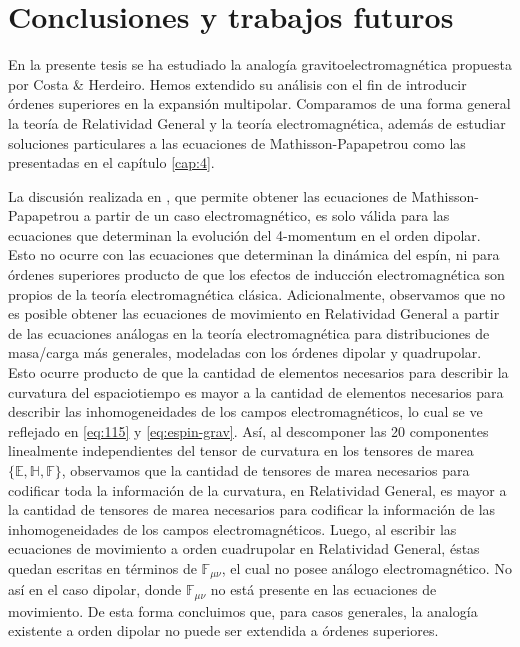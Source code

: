 \chapter{Conclusiones y trabajos futuros}

En la presente tesis se ha estudiado la analogía gravitoelectromagnética propuesta por Costa \& Herdeiro. Hemos extendido su análisis con el fin de introducir órdenes superiores en la expansión multipolar. Comparamos de una forma general la teoría de Relatividad General y la teoría electromagnética, además de estudiar soluciones particulares a las ecuaciones de Mathisson-Papapetrou como las presentadas en el capítulo \ref{cap:4}.

La discusión realizada en \cite{Costa-Herdeiro}, que permite obtener las ecuaciones de Mathisson-Papapetrou a partir de un caso electromagnético, es solo válida para las ecuaciones que determinan la evolución del 4-momentum en el orden dipolar. Esto no ocurre con las ecuaciones que determinan la dinámica del espín, ni para órdenes superiores producto de que los efectos de inducción electromagnética son propios de la teoría electromagnética clásica. Adicionalmente, observamos que no es posible obtener las ecuaciones de movimiento en Relatividad General a partir de las ecuaciones análogas en la teoría electromagnética para distribuciones de masa/carga más generales, modeladas con los órdenes dipolar y quadrupolar. Esto ocurre producto de que la cantidad de elementos necesarios para describir la curvatura del espaciotiempo es mayor a la cantidad de elementos necesarios para describir las inhomogeneidades de los campos electromagnéticos, lo cual se ve reflejado en \eqref{eq:115} y \eqref{eq:espin-grav}. Así, al descomponer las 20 componentes linealmente independientes del tensor de curvatura en los tensores de marea $\{ \mathbb{E}, \mathbb{H}, \mathbb{F} \}$, observamos que la cantidad de tensores de marea necesarios para codificar toda la información de la curvatura, en Relatividad General, es mayor a la cantidad de tensores de marea necesarios para codificar la información de las inhomogeneidades de los campos electromagnéticos. Luego, al escribir las ecuaciones de movimiento a orden cuadrupolar en Relatividad General, éstas quedan escritas en términos de $\mathbb{F}_{\mu \nu}$, el cual no posee análogo electromagnético. No así en el caso dipolar, donde $\mathbb{F}_{\mu \nu}$ no está presente en las ecuaciones de movimiento. De esta forma concluimos que, para casos generales, la analogía existente a orden dipolar no puede ser extendida a órdenes superiores.

